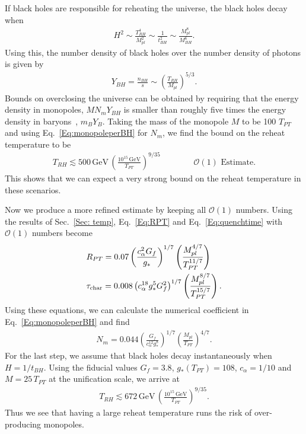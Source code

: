 \documentclass[superscriptaddress,groupedaddress,nofootnoteinbib,11pt]{article}
\newcommand{\AH}[1]{\textcolor{Red}{\textsf{[AH: #1]}}}
\newcommand\eea{\end{eqnarray}}
\newcommand\bea{\begin{eqnarray}}
\newcommand{\mpl}{M_{pl}}
\newcommand{\trh}{T_{RH}}
\def\l{\left(}
\def\r{\right)}
\begin{document}
If black holes are responsible for reheating the universe, the black holes decay when  
\bea
H^2 \sim \frac{\trh^4}{\mpl^2} \sim \frac{1}{t_{BH}^2} \sim \frac{\mpl^8}{M_{BH}^6}.
\eea
Using this, the number density of black holes over the number density of photons is given by
\bea
Y_{BH} = \frac{n_{BH}}{s} \sim \left ( \frac{\trh}{\mpl} \right )^{5/3}.
\eea
Bounds on overclosing the universe can be obtained by requiring that the energy density in monopoles, $M N_m Y_{BH}$ is smaller than roughly five times the energy density in baryons~\cite{Planck:2018vyg}, $m_B Y_B$.  Taking the mass of the monopole $M$ to be 100 $T_{PT}$ and using Eq.~\ref{Eq:monopoleperBH} for $N_m$, we find the bound on the reheat temperature to be
\bea
T_{RH} \lesssim 500 \, \text{GeV} \, \left ( \frac{10^{15} \, \text{GeV}}{T_{PT}} \right )^{9/35} \qquad \qquad \text{$\mathcal{O}(1)$ Estimate}.
\eea
This shows that we can expect a very strong bound on the reheat temperature in these scenarios.



Now we produce a more refined estimate by keeping all $\mathcal{O}(1)$ numbers. Using the results of Sec.~\ref{Sec: temp}, Eq.~\ref{Eq:RPT} and Eq.~\ref{Eq:quenchtime} with  $\mathcal{O}(1)$ numbers become
\begin{equation}\label{Eq:RPTO1}
    \begin{split}
        &R_{PT}=0.07 \l{\frac{c_{\alpha} ^2 G_f}{g_*}}\r^{1/7}\l\frac{\mpl^{4/7}}{T_{PT}^{11/7}}\r\\
        &\tau_{\rm char}=0.008\l c_{\alpha} ^{18} g_*^5 G_f^2\r^{1/7}\l\frac{\mpl^{8/7}}{T_{PT}^{15/7}}\r .
    \end{split}
\end{equation}
Using these equations, we can calculate the numerical coefficient in Eq.~\ref{Eq:monopoleperBH} and find
\bea \label{Eq: NMO1}
N_m =0.044\l\frac{G_f}{c_{\alpha} ^{12} g_*^8}\r^{1/7} \l  \frac{\mpl}{T_{PT}} \r ^{4/7} .
\eea
For the last step, we assume that black holes decay instantaneously when $H = 1/t_{BH}$.
Using the fiducial values $G_f=3.8$, $g_*(T_{PT})=108$, $c_{\alpha}=1/10$ and $M=25\, T_{PT}$ at the unification scale, we arrive at
\bea\label{Eq:FinalReheat}
T_{RH} \lesssim 672 \, \text{GeV} \, \left ( \frac{10^{15} \, \text{GeV}}{T_{PT}} \right )^{9/35}.
\eea
Thus we see that having a large reheat temperature runs the risk of over-producing monopoles.

\end{document}
